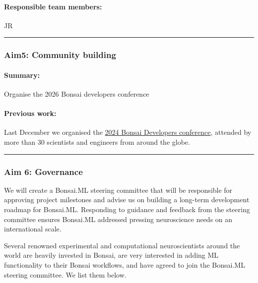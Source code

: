 \paragraph{Responsible team members:} JR

\noindent\rule{\textwidth}{1pt}
\subsubsection{Aim5: Community building}
\paragraph{Summary:} Organise the 2026 Bonsai developers conference

\paragraph{Previous work:} Last December we organised the \href{https://conference.bonsai-rx.org/2024/}{2024 Bonsai Developers conference}, attended by more than 30 scientists and engineers from around the globe.

\noindent\rule{\textwidth}{1pt}
\subsubsection{Aim 6: Governance}

We will create a Bonsai.ML steering committee that will be responsible for
approving project milestones and advise us on building a long-term development
roadmap for Bonsai.ML.
%
Responding to guidance and feedback from the steering committee ensures
Bonsai.ML addressed pressing neuroscience needs on an international scale.

Several renowned experimental and computational neuroscientists around the
world are heavily invested in Bonsai, are very interested in adding ML
functionality to their Bonsai workflows, and have agreed to join the Bonsai.ML
steering committee. We list them below.

